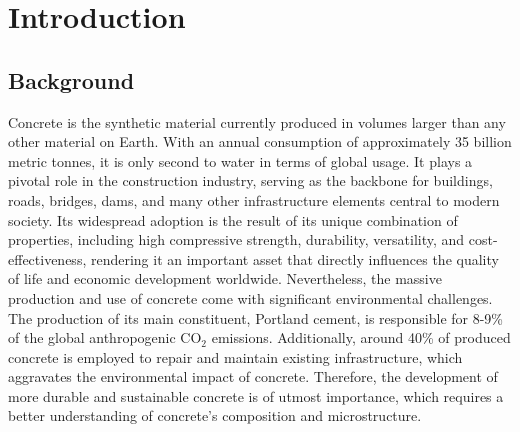 
\chapter{Introduction} %

\label{Chapter1} %



\section{Background}
Concrete is the synthetic material currently produced in volumes larger than any other material on Earth. With an annual consumption of approximately 35 billion metric tonnes, it is only second to water in terms of global usage\supercite{mehta2014concrete, Monteiro2017}. It plays a pivotal role in the construction industry, serving as the backbone for buildings, roads, bridges, dams, and many other infrastructure elements central to modern society. Its widespread adoption is the result of its unique combination of properties, including high compressive strength, durability, versatility, and cost-effectiveness\supercite{mehta2014concrete}, rendering it an important asset that directly influences the quality of life and economic development worldwide\supercite{VanDamme2018, Biernacki2017}. Nevertheless, the massive production and use of concrete come with significant environmental challenges. The production of its main constituent, Portland cement, is responsible for 8-9\% of the global anthropogenic CO$_2$ emissions\supercite{Monteiro2017}. Additionally, around 40\% of produced concrete is employed to repair and maintain existing infrastructure\supercite{mehta2014concrete}, which aggravates the environmental impact of concrete. Therefore, the development of more durable and sustainable concrete is of utmost importance, which requires a better understanding of concrete's composition and microstructure. 

